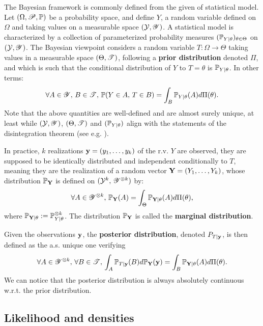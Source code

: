 The Bayesian framework is commonly defined from the given of statistical model.
Let $(\Omega,\mathscr{P},\mathbb{P})$ be a probability space, and define $Y$, a random variable defined on $\Omega$ and taking values on a measurable space $(\mathcal{Y},\mathscr{Y})$.
A statistical model is characterized by a collection of parameterized probability measures $(\mathbb{P}_{Y|\theta})_{\theta\in\Theta}$ on $(\mathcal{Y},\mathscr{Y})$.
The Bayesian viewpoint considers a random variable $T:\Omega\to\Theta$ taking values in a measurable space $(\Theta,\mathscr{T})$, following a \textbf{prior distribution} denoted $\Pi$, and which is such that the conditional distribution of $Y$ to $T=\theta$ is $\mathbb{P}_{Y|\theta}$. In other terms:
    \begin{equation}
        \forall A\in\mathscr{Y},\,B\in\mathscr{T},\, \mathbb{P}(Y\in A,\, T\in B) = \int_B \mathbb{P}_{Y|\theta}(A) d\Pi(\theta).
    \end{equation}
Note that the above quantities are well-defined and are almost surely unique, at least while $(\mathcal{Y},\mathscr{Y})$, $(\Theta,\mathscr{T})$ and $(\mathbb{P}_{Y|\theta})$ align with the statements of the disintegration theorem (see e.g. \cite{chang_conditioning_1997}).

In practice, $k$ realizations $\mathbf{y}= (y_1,\dots,y_k)$ of the r.v. $Y$ are observed, they are supposed to be identically distributed and independent conditionally to $T$, meaning they are the realization of a random vector $\mathbf{Y} = (Y_1,\dots,Y_k)$, whose distribution $\mathbb{P}_{\mathbf{Y}}$ is defined on $(\mathcal{Y}^k,\,\mathscr{Y}^{\otimes k})$ by:
\begin{equation}
    \forall A\in\mathscr{Y}^{\otimes k},\, \mathbb{P}_{\mathbf{Y}}(A) = \int_\Theta \mathbb{P}_{\mathbf{Y}|\theta}(A)d\Pi(\theta),
\end{equation}
where $\mathbb{P}_{\mathbf{Y}|\theta}:=\mathbb{P}_{Y|\theta}^{\otimes k}$. The distribution $\mathbb{P}_{\mathbf{Y}}$ is called the \textbf{marginal distribution}.

Given the observations $\mathbf{y}$, the \textbf{posterior distribution}, denoted $P_{T|\mathbf{y}}$, is then defined as the a.s. unique one verifying
    \begin{equation}
        \forall A\in\mathscr{Y}^{\otimes k},\,\forall B\in\mathscr{T},\, \int_{A}\mathbb{P}_{T|\mathbf{y}}(B)d\mathbb{P}_{\mathbf{Y}}(\mathbf{y}) = \int_B \mathbb{P}_{\mathbf{Y}|\theta}(A)d\Pi(\theta).
    \end{equation}
We can notice that the posterior distribution is always absolutely continuous w.r.t. the prior distribution.


\subsection{Likelihood and densities}\label{sec:intro-ref:likelihoods}


